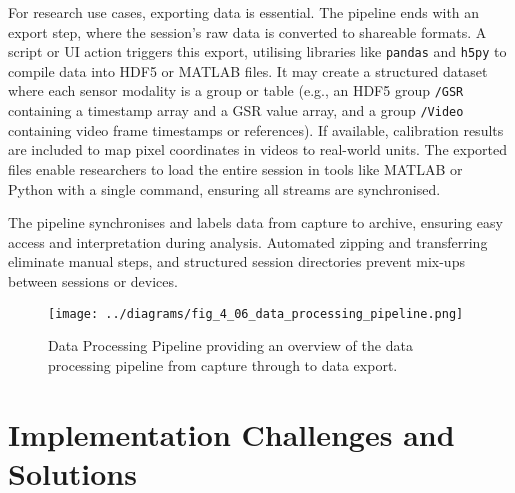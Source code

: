 For research use cases, exporting data is essential. The pipeline ends with an export step, where the session's raw data is converted to shareable formats. A script or UI action triggers this export, utilising libraries like \texttt{pandas} \cite{ref23} and \texttt{h5py} \cite{ref24} to compile data into HDF5 or MATLAB files. It may create a structured dataset where each sensor modality is a group or table (e.g., an HDF5 group \texttt{/GSR} containing a timestamp array and a GSR value array, and a group \texttt{/Video} containing video frame timestamps or references). If available, calibration results are included to map pixel coordinates in videos to real-world units. The exported files enable researchers to load the entire session in tools like MATLAB or Python with a single command, ensuring all streams are synchronised.

The pipeline synchronises and labels data from capture to archive, ensuring easy access and interpretation during analysis. Automated zipping and transferring eliminate manual steps, and structured session directories prevent mix-ups between sessions or devices.

\begin{figure}[htbp]
    \centring
    \texttt{[image: ../diagrams/fig\_4\_06\_data\_processing\_pipeline.png]}
    \caption{Data Processing Pipeline providing an overview of the data processing pipeline from capture through to data export.}
    \label{fig:4_06_data_processing_pipeline_repeat}
\end{figure}


\section{Implementation Challenges and Solutions}\label{sec:4-6}

